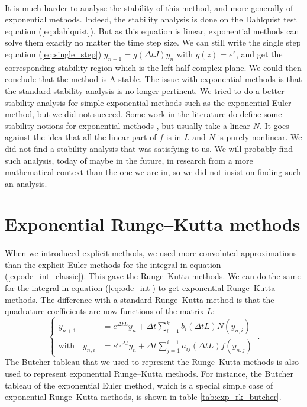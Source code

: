       \paragraph{}
      It is much harder to analyse the stability of this method, and more generally of exponential methods.
      Indeed, the stability analysis is done on the Dahlquist test equation (\ref{eq:dahlquist}).
      But as this equation is linear, exponential methods can solve them exactly no matter the time step size.
      We can still write the single step equation (\ref{eq:single_step}) $y_{n+1} = g\left(\Delta tJ\right)y_n$ with $g\left(z\right) = e^z$, and get the corresponding stability region which is the left half complex plane.
      We could then conclude that the method is A-stable.
      The issue with exponential methods is that the standard stability analysis is no longer pertinent.
      We tried to do a better stability analysis for simple exponential methods such as the exponential Euler method, but we did not succeed.
      Some work in the literature do define some stability notions for exponential methods \cite{DuZhu2004}, but usually take a linear $N$.
      It goes against the idea that all the linear part of $f$ is in $L$ and $N$ is purely nonlinear.
      We did not find a stability analysis that was satisfying to us.
      We will probably find such analysis, today of maybe in the future, in research from a more mathematical context than the one we are in, so we did not insist on finding such an analysis.


  \section{Exponential Runge--Kutta methods}

    \paragraph{}
    When we introduced explicit methods, we used more convoluted approximations than the explicit Euler methods for the integral in equation (\ref{eq:ode_int_classic}).
    This gave the Runge--Kutta methods.
    We can do the same for the integral in equation (\ref{eq:ode_int}) to get exponential Runge--Kutta methods.
    The difference with a standard Runge--Kutta method is that the quadrature coefficients are now functions of the matrix $L$:
    \begin{equation}
      \left\{\begin{aligned}
        y_{n+1} &= e^{\Delta tL} y_n + \Delta t \sum_{i = 1}^k b_i\left(\Delta t L\right) N\left(y_{n,i}\right) \\
        \textrm{with}\quad y_{n,i} &= e^{c_i \Delta t} y_n + \Delta t \sum_{j = 1}^{i-1} a_{ij}\left(\Delta t L\right) f\left(y_{n,j}\right)
      \end{aligned}\right. \ .
    \end{equation}
    The Butcher tableau that we used to represent the Runge--Kutta methods is also used to represent exponential Runge--Kutta methods.
    For instance, the Butcher tableau of the exponential Euler method, which is a special simple case of exponential Runge--Kutta methods, is shown in table \ref{tab:exp_rk_butcher}.

